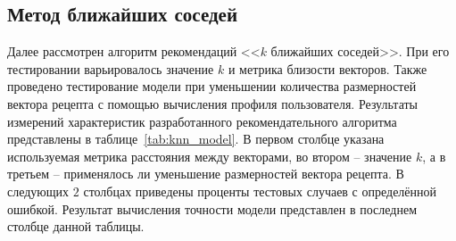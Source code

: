 \subsection{Метод ближайших соседей}
Далее рассмотрен алгоритм рекомендаций <<$k$ ближайших соседей>>.
При его тестировании варьировалось значение $k$ и метрика близости векторов.
Также проведено тестирование модели при уменьшении количества размерностей вектора рецепта с помощью вычисления профиля пользователя.
Результаты измерений характеристик разработанного рекомендательного алгоритма представлены в таблице~\ref{tab:knn_model}.
В первом столбце указана используемая метрика расстояния между векторами, во втором -- значение $k$, а в третьем -- применялось ли уменьшение размерностей вектора рецепта.
В следующих $2$ столбцах приведены проценты тестовых случаев с определённой ошибкой.
Результат вычисления точности модели представлен в последнем столбце данной таблицы.

